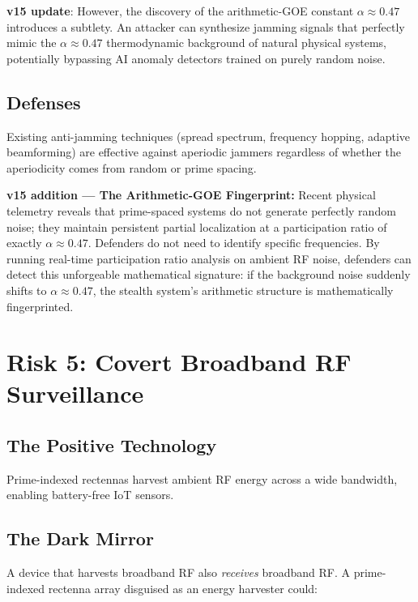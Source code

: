 \documentclass[11pt,a4paper]{article}
\begin{document}
\textbf{v15 update}: However, the discovery of the arithmetic-GOE
constant $\alpha \approx 0.47$ introduces a subtlety. An attacker can
synthesize jamming signals that perfectly mimic the $\alpha \approx 0.47$
thermodynamic background of natural physical systems, potentially
bypassing AI anomaly detectors trained on purely random noise.

\subsection{Defenses}

Existing anti-jamming techniques (spread spectrum, frequency
hopping, adaptive beamforming) are effective against aperiodic
jammers regardless of whether the aperiodicity comes from random
or prime spacing.

\textbf{v15 addition --- The Arithmetic-GOE Fingerprint:}
Recent physical telemetry reveals that prime-spaced systems do not
generate perfectly random noise; they maintain persistent partial
localization at a participation ratio of exactly $\alpha \approx 0.47$.
Defenders do not need to identify specific frequencies.
By running real-time participation ratio analysis on ambient RF noise,
defenders can detect this unforgeable mathematical signature: if the
background noise suddenly shifts to $\alpha \approx 0.47$, the stealth
system's arithmetic structure is mathematically fingerprinted.

\section{Risk 5: Covert Broadband RF Surveillance}
\label{sec:surveillance}

\subsection{The Positive Technology}

Prime-indexed rectennas harvest ambient RF energy across a wide
bandwidth, enabling battery-free IoT sensors.

\subsection{The Dark Mirror}

A device that harvests broadband RF also \emph{receives} broadband
RF. A prime-indexed rectenna array disguised as an energy harvester
could:
\end{document}
